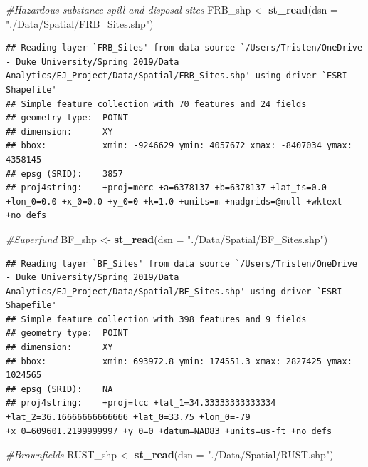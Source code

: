 \documentclass[12pt,]{article}
\newenvironment{Shaded}{\begin{snugshade}}{\end{snugshade}}
\newcommand{\KeywordTok}[1]{\textcolor[rgb]{0.13,0.29,0.53}{\textbf{#1}}}
\newcommand{\DataTypeTok}[1]{\textcolor[rgb]{0.13,0.29,0.53}{#1}}
\newcommand{\StringTok}[1]{\textcolor[rgb]{0.31,0.60,0.02}{#1}}
\newcommand{\CommentTok}[1]{\textcolor[rgb]{0.56,0.35,0.01}{\textit{#1}}}
\newcommand{\NormalTok}[1]{#1}
\begin{document}
\begin{Shaded}
\begin{Highlighting}[]
\CommentTok{#Hazardous substance spill and disposal sites }
\NormalTok{FRB_shp <-}\StringTok{ }\KeywordTok{st_read}\NormalTok{(}\DataTypeTok{dsn =} \StringTok{"./Data/Spatial/FRB_Sites.shp"}\NormalTok{) }
\end{Highlighting}
\end{Shaded}

\begin{verbatim}
## Reading layer `FRB_Sites' from data source `/Users/Tristen/OneDrive - Duke University/Spring 2019/Data Analytics/EJ_Project/Data/Spatial/FRB_Sites.shp' using driver `ESRI Shapefile'
## Simple feature collection with 70 features and 24 fields
## geometry type:  POINT
## dimension:      XY
## bbox:           xmin: -9246629 ymin: 4057672 xmax: -8407034 ymax: 4358145
## epsg (SRID):    3857
## proj4string:    +proj=merc +a=6378137 +b=6378137 +lat_ts=0.0 +lon_0=0.0 +x_0=0.0 +y_0=0 +k=1.0 +units=m +nadgrids=@null +wktext +no_defs
\end{verbatim}

\begin{Shaded}
\begin{Highlighting}[]
\CommentTok{#Superfund}
\NormalTok{BF_shp <-}\StringTok{ }\KeywordTok{st_read}\NormalTok{(}\DataTypeTok{dsn =} \StringTok{"./Data/Spatial/BF_Sites.shp"}\NormalTok{) }
\end{Highlighting}
\end{Shaded}

\begin{verbatim}
## Reading layer `BF_Sites' from data source `/Users/Tristen/OneDrive - Duke University/Spring 2019/Data Analytics/EJ_Project/Data/Spatial/BF_Sites.shp' using driver `ESRI Shapefile'
## Simple feature collection with 398 features and 9 fields
## geometry type:  POINT
## dimension:      XY
## bbox:           xmin: 693972.8 ymin: 174551.3 xmax: 2827425 ymax: 1024565
## epsg (SRID):    NA
## proj4string:    +proj=lcc +lat_1=34.33333333333334 +lat_2=36.16666666666666 +lat_0=33.75 +lon_0=-79 +x_0=609601.2199999997 +y_0=0 +datum=NAD83 +units=us-ft +no_defs
\end{verbatim}

\begin{Shaded}
\begin{Highlighting}[]
\CommentTok{#Brownfields}
\NormalTok{RUST_shp <-}\StringTok{ }\KeywordTok{st_read}\NormalTok{(}\DataTypeTok{dsn =} \StringTok{"./Data/Spatial/RUST.shp"}\NormalTok{) }
\end{Highlighting}
\end{Shaded}
\end{document}
